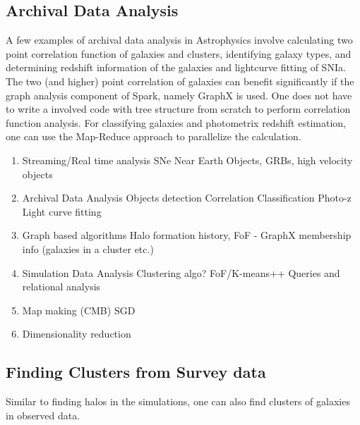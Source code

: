 \documentclass[twocolumn, prd]{revtex4}
\begin{document}
\subsection{Archival Data Analysis}
A few examples of archival data analysis in Astrophysics involve calculating two point correlation function of galaxies and clusters, identifying galaxy types, and determining redshift information of the galaxies and lightcurve fitting of SNIa. The two (and higher) point correlation of galaxies can benefit significantly if the graph analysis component of Spark, namely GraphX is used. One does not have to write a involved code with tree structure from scratch to perform correlation function analysis. For classifying galaxies and photometrix redshift estimation, one can use the Map-Reduce approach to parallelize the calculation.

 



\begin{enumerate}

\item Streaming/Real time analysis
	\subitem SNe
	\subitem  Near Earth Objects, GRBs, high velocity objects
\item Archival Data Analysis 
	\subitem  Objects detection 
	\subitem Correlation 
	\subitem Classification 
	\subitem  Photo-z 
	\subitem Light curve fitting 
\item Graph based algorithms 
\subitem Halo formation history, FoF - GraphX 
\subitem membership info (galaxies in a cluster etc.)
\item Simulation Data Analysis
\subitem Clustering algo? FoF/K-means++
\subitem Queries and relational analysis
\item Map making (CMB) SGD 
\item Dimensionality reduction
\end{enumerate}

\subsection{Finding Clusters from Survey data}
Similar to finding halos in the simulations, one can also find clusters of galaxies in observed data.



\end{document}
